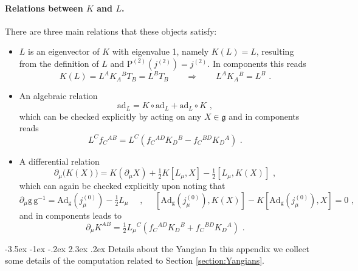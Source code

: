 \documentclass[12pt]{article}
\makeatletter
\renewcommand\section{\@startsection {section}{1}{\z@}%
                                   {-3.5ex \@plus -1ex \@minus -.2ex}%
                                   {2.3ex \@plus.2ex}%
                                   {\normalfont\large\bfseries}}
\numberwithin{equation}{section}
\makeatother
\begin{document}
\paragraph{Relations between $K$ and $L$.} There are three main relations that these objects satisfy:
\begin{itemize}
\item $L$ is an eigenvector of $K$ with eigenvalue 1, namely $K(L)=L$, resulting from the definition of $L$ and $\mathrm{P}^{(2)}(j^{(2)})=j^{(2)}$. In components this reads
\begin{equation}\label{J-eigenvector-components}
K(L)=L^{A}K_{A}{}^{B}T_{B}=L^{B}T_{B}
\qquad \Rightarrow \qquad
L^{A}K_{A}{}^{B}=L^{B} \,\, .
\end{equation}
\item An algebraic relation
\begin{equation}
\mathrm{ad}_{L} = K \circ \mathrm{ad}_{L}+\mathrm{ad}_{L}\circ K \,\, ,
\end{equation}
which can be checked explicitly by acting on any $X\in \mathfrak{g}$ and in components reads
\begin{equation}\label{J-K-algebraic-relation-components}
L^{C}f_{C}{}^{AB}=L^{C}(f_{C}{}^{AD}K_{D}{}^{B}-f_{C}{}^{BD}K_{D}{}^{A}) \,\, .
\end{equation}
\item A differential relation
\begin{equation}\label{J-K-differential-relation}
\partial_{\mu} \bigl( K(X)\bigr)=K(\partial_{\mu}X)+\tfrac{1}{2}K[L_{\mu},X]-\tfrac{1}{2}[L_{\mu},K(X)] \,\, ,
\end{equation}
which can again be checked explicitly upon noting that
\begin{equation}
\partial_{\mu}\mathrm{g} \, \mathrm{g}^{-1} = \mathrm{Ad}_{\mathrm{g}}(j^{(0)}_{\mu})-\tfrac{1}{2}L_{\mu} \quad\,\, , \quad\,\, [\mathrm{Ad}_{\mathrm{g}}(j^{(0)}_{\mu}),K(X)]-K[\mathrm{Ad}_{\mathrm{g}}(j^{(0)}_{\mu}),X]=0 \,\, ,
\end{equation}
and in components leads to
\begin{equation}\label{J-K-differential-relation-components}
\partial_{\mu}K^{AB}=\tfrac{1}{2}L_{\mu}{}^{C}(f_{C}{}^{AD}K_{D}{}^{B}+f_{C}{}^{BD}K_{D}{}^{A}) \,\, .
\end{equation}
\end{itemize}



\newpage


\section{Details about the Yangian}\label{appendix:B}
In this appendix we collect some details of the computation related to Section \ref{section:Yangians}.
\end{document}
